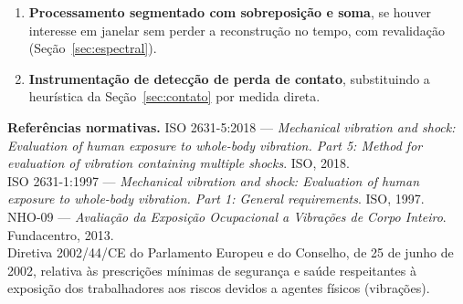 \documentclass[11pt,a4paper]{article}
\begin{document}
\begin{enumerate}
        reinício do filtro passa-alta a cada bloco desvia menos de 1\% --- não
        é obstáculo --- e a revisão de literatura da Seção~\ref{sec:licoes}
        encontrou precedente publicado para exatamente esse tipo de
        extrapolação de amostra parcial (60\,s, poucos minutos de trecho, ou um
        ciclo de trabalho de 40\%) para uma dose diária, usando a mesma lógica
        de escala temporal da própria norma. Um teste isolado em dados reais de
        campo (dia inteiro, assento, 25/03/2025) produziu $R=0{,}59$,
        $\Pi\approx 6\%$ --- dentro da faixa plausível da Tabela~C.2, nem
        saturado em zero nem em cem por cento --- antes de a funcionalidade ser
        exposta na interface.
  \item \textbf{Processamento segmentado com sobreposição e soma}, se houver
        interesse em janelar sem perder a reconstrução no tempo, com
        revalidação (Seção~\ref{sec:espectral}).
  \item \textbf{Instrumentação de detecção de perda de contato}, substituindo a
        heurística da Seção~\ref{sec:contato} por medida direta.
\end{enumerate}

\vspace{1em}
\noindent\textbf{Referências normativas.}\;
ISO 2631-5:2018 --- \emph{Mechanical vibration and shock: Evaluation of human
exposure to whole-body vibration. Part 5: Method for evaluation of vibration
containing multiple shocks}. ISO, 2018.\\
ISO 2631-1:1997 --- \emph{Mechanical vibration and shock: Evaluation of human
exposure to whole-body vibration. Part 1: General requirements}. ISO, 1997.\\
NHO-09 --- \emph{Avaliação da Exposição Ocupacional a Vibrações de Corpo
Inteiro}. Fundacentro, 2013.\\
Diretiva 2002/44/CE do Parlamento Europeu e do Conselho, de 25 de junho de 2002,
relativa às prescrições mínimas de segurança e saúde respeitantes à exposição
dos trabalhadores aos riscos devidos a agentes físicos (vibrações).
\end{document}
